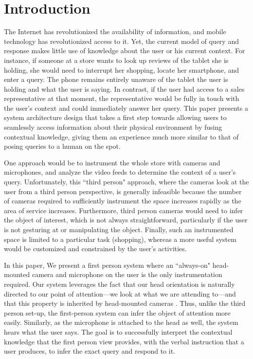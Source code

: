 \documentclass{llncs}
\begin{document}
\section{Introduction}
The Internet has revolutionized the availability of information, and
mobile technology has revolutionized access to it. Yet, the current
model of query and response makes little use of knowledge about the
user or his current context.  For instance, if someone at a store
wants to look up reviews of the tablet she is holding, she would need
to interrupt her shopping, locate her smartphone, and enter a
query. The phone remains entirely unaware of the tablet the user is
holding and what the user is saying. In contrast, if the user had
access to a sales representative at that moment, the representative
would be fully in touch with the user's context and could immediately
answer her query.  This paper presents a system architecture design
that takes a first step towards allowing users to seamlessly access
information about their physical environment by fusing contextual
knowledge, giving them an experience much more similar to that of
posing queries to a human on the spot.

One approach would be to instrument the whole store with cameras and
microphones, and analyze the video feeds to determine the context of a
user's query. Unfortunately, this ``third person" approach, where the
cameras look at the user from a third person perspective, is generally
infeasible because the number of cameras required to sufficiently
instrument the space increases rapidly as the area of service
increases. Furthermore, third person cameras would need to infer the
object of interest, which is not always straightforward, particularly
if the user is not gesturing at or manipulating the object. Finally,
such an instrumented space is limited to a particular task (shopping),
whereas a more useful system would be customized and constrained by
the user's activities.

In this paper, We present a first person system \citep{fpv} where an
``always-on" head-mounted camera and microphone on the user is the
only instrumentation required. Our system leverages the fact that our
head orientation is naturally directed to our point of attention---we
look at what we are attending to---and that this property is inherited
by head-mounted cameras \citep{Park12}. Thus, unlike the third person
set-up, the first-person system can infer the object of attention more
easily.  Similarly, as the microphone is attached to the head as well,
the system hears what the user says. The goal is to successfully
interpret the contextual knowledge that the first person view
provides, with the verbal instruction that a user produces, to infer
the exact query and respond to it.
\end{document}
